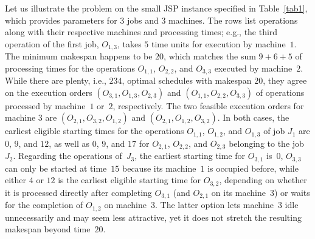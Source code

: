 \documentclass[runningheads]{llncs}
\begin{document}
Let us illustrate the problem on the small JSP instance specified in Table~\ref{tab1}, which provides parameters for $3$ jobs and $3$ machines. 
The rows list operations along with their respective machines and processing times; e.g., the third operation of the first job, $O_{1,3}$, takes $5$ time units for execution by machine~$1$.
The minimum makespan happens to be $20$, which matches the sum $9+6+5$ of processing times for the operations $O_{1,1}$, $O_{2,2}$, and $O_{3,3}$ executed by machine~$2$.
While there are plenty, i.e., $234$, optimal schedules with makespan $20$,
they agree on the execution orders $(O_{3,1}, O_{1,3}, O_{2,3})$ and $(O_{1,1}, O_{2,2}, O_{3,3})$
of operations processed by machine~$1$ or~$2$, respectively.
The two feasible execution orders for machine $3$ are
$(O_{2,1}, O_{3,2}, O_{1,2})$ and
$(O_{2,1}, O_{1,2}, O_{3,2})$.
In both cases, the earliest eligible starting times for the operations
$O_{1,1}$, $O_{1,2}$, and $O_{1,3}$ of job $J_1$ are
$0$, $9$, and $12$,
as well as
$0$, $9$, and $17$ for $O_{2,1}$, $O_{2,2}$, and $O_{2,3}$
belonging to the job~$J_2$.
Regarding the operations of~$J_3$,
the earliest starting time for $O_{3,1}$ is~$0$,
$O_{3,3}$ can only be started at time~$15$ because its machine~$1$
is occupied before,
while either $4$ or $12$ is the earliest eligible starting time for $O_{3,2}$,
depending on whether it is processed directly after completing $O_{3,1}$
(and $O_{2,1}$ on its machine~$3$) or waits for the completion of $O_{1,2}$
on machine~$3$.
The latter option lets machine~$3$ idle unnecessarily 
and may seem less attractive,
yet it does not stretch the resulting makespan beyond time~$20$. 
%
%
\end{document}
